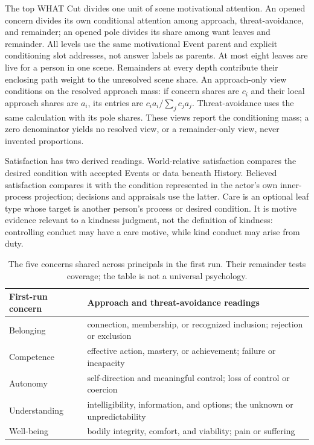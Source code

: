 \documentclass[11pt,a4paper]{article}
\begin{document}
The top WHAT Cut divides one unit of scene motivational attention. An opened
concern divides its own conditional attention among approach, threat-avoidance,
and remainder; an opened pole divides its share among want leaves and remainder.
All levels use the same motivational Event parent and explicit conditioning
slot addresses, not answer labels as parents.
At most eight leaves are live for a person in one scene. Remainders at every
depth contribute their enclosing path weight to the unresolved scene share.
An approach-only view conditions on the resolved approach mass: if concern
shares are $c_i$ and their local approach shares are $a_i$, its entries are
$c_i a_i/\sum_j c_j a_j$. Threat-avoidance uses the same calculation with its
pole shares. These views report the conditioning mass; a zero denominator
yields no resolved view, or a remainder-only view, never invented proportions.

Satisfaction has two derived readings. World-relative satisfaction compares
the desired condition with accepted Events or data beneath History. Believed
satisfaction compares it with the condition represented in the actor's own
inner-process projection; decisions and appraisals use the latter. Care is an optional
leaf type whose target is another person's process or desired condition. It is motive evidence
relevant to a kindness judgment, not the definition of kindness: controlling
conduct may have a care motive, while kind conduct may arise from duty.

\begin{table}[H]
\centering
\scriptsize
\begin{tabularx}{\textwidth}{@{}p{}Y@{}}
\toprule
First-run concern & Approach and threat-avoidance readings \\
\midrule
Belonging & connection, membership, or recognized inclusion; rejection or exclusion \\
Competence & effective action, mastery, or achievement; failure or incapacity \\
Autonomy & self-direction and meaningful control; loss of control or coercion \\
Understanding & intelligibility, information, and options; the unknown or unpredictability \\
Well-being & bodily integrity, comfort, and viability; pain or suffering \\
\bottomrule
\end{tabularx}
\caption{The five concerns shared across principals in the first run. Their
remainder tests coverage; the table is not a universal psychology.}
\label{tab:concern-vocabulary}
\end{table}
\end{document}
